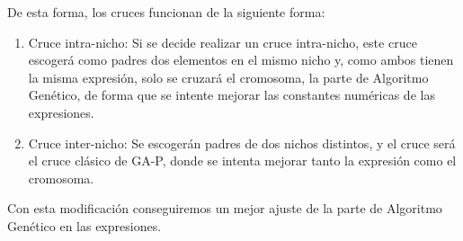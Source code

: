 De esta forma, los cruces funcionan de la siguiente forma:

\begin{enumerate}
	\item Cruce intra-nicho: Si se decide realizar un cruce intra-nicho, este cruce escogerá como padres dos elementos en el mismo nicho y, como ambos tienen la misma expresión, solo se cruzará el cromosoma, la parte de Algoritmo Genético, de forma que se intente mejorar las constantes numéricas de las expresiones.
	\item Cruce inter-nicho: Se escogerán padres de dos nichos distintos, y el cruce será el cruce clásico de GA-P, donde se intenta mejorar tanto la expresión como el cromosoma.
\end{enumerate}


Con esta modificación conseguiremos un mejor ajuste de la parte de Algoritmo Genético en las expresiones.


\newpage
